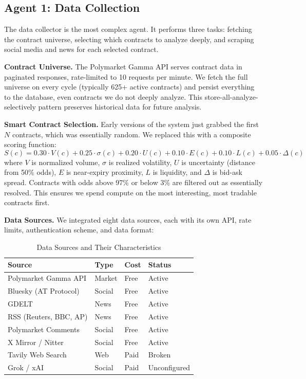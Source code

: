 \documentclass[conference]{IEEEtran}
\begin{document}
\subsection{Agent 1: Data Collection}

The data collector is the most complex agent. It performs three tasks: fetching the contract universe, selecting which contracts to analyze deeply, and scraping social media and news for each selected contract.

\textbf{Contract Universe.} The Polymarket Gamma API serves contract data in paginated responses, rate-limited to 10 requests per minute. We fetch the full universe on every cycle (typically 625+ active contracts) and persist everything to the database, even contracts we do not deeply analyze. This store-all-analyze-selectively pattern preserves historical data for future analysis.

\textbf{Smart Contract Selection.} Early versions of the system just grabbed the first $N$ contracts, which was essentially random. We replaced this with a composite scoring function:
\begin{equation}
S(c) = 0.30 \cdot V(c) + 0.25 \cdot \sigma(c) + 0.20 \cdot U(c) + 0.10 \cdot E(c) + 0.10 \cdot L(c) + 0.05 \cdot \Delta(c)
\end{equation}
where $V$ is normalized volume, $\sigma$ is realized volatility, $U$ is uncertainty (distance from 50\% odds), $E$ is near-expiry proximity, $L$ is liquidity, and $\Delta$ is bid-ask spread. Contracts with odds above 97\% or below 3\% are filtered out as essentially resolved. This ensures we spend compute on the most interesting, most tradable contracts first.

\textbf{Data Sources.} We integrated eight data sources, each with its own API, rate limits, authentication scheme, and data format:

\begin{table}[H]
\centering
\caption{Data Sources and Their Characteristics}
\begin{tabular}{@{}llll@{}}
\toprule
\textbf{Source} & \textbf{Type} & \textbf{Cost} & \textbf{Status} \\
\midrule
Polymarket Gamma API & Market & Free & Active \\
Bluesky (AT Protocol) & Social & Free & Active \\
GDELT & News & Free & Active \\
RSS (Reuters, BBC, AP) & News & Free & Active \\
Polymarket Comments & Social & Free & Active \\
X Mirror / Nitter & Social & Free & Active \\
Tavily Web Search & Web & Paid & Broken \\
Grok / xAI & Social & Paid & Unconfigured \\
\bottomrule
\end{tabular}
\label{tab:sources}
\end{table}
\end{document}
